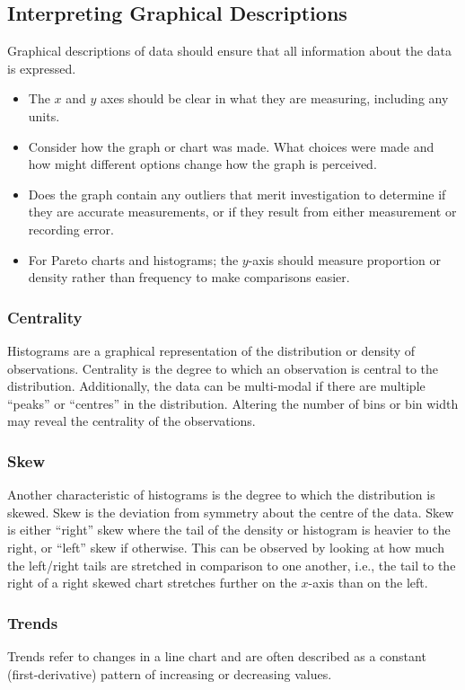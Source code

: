 \documentclass{article}
\begin{document}
\subsection{Interpreting Graphical Descriptions}
Graphical descriptions of data should ensure that all information about
the data is expressed.
\begin{itemize}
    \item The \(x\) and \(y\) axes should be clear in what they are
          measuring, including any units.
    \item Consider how the graph or chart was made. What choices were
          made and how might different options change how the graph is
          perceived.
    \item Does the graph contain any outliers that merit investigation
          to determine if they are accurate measurements, or if they
          result from either measurement or recording error.
    \item For Pareto charts and histograms; the \(y\)-axis should
          measure proportion or density rather than frequency to make
          comparisons easier.
\end{itemize}
\subsubsection{Centrality}
Histograms are a graphical representation of the distribution or
density of observations. Centrality is the degree to which an
observation is central to the distribution. Additionally, the data can
be multi-modal if there are multiple ``peaks'' or ``centres'' in the
distribution. Altering the number of bins or bin width may reveal the
centrality of the observations.
\subsubsection{Skew}
Another characteristic of histograms is the degree to which the
distribution is skewed. Skew is the deviation from symmetry about the
centre of the data. Skew is either ``right'' skew where the tail of the
density or histogram is heavier to the right, or ``left'' skew if
otherwise. This can be observed by looking at how much the left/right
tails are stretched in comparison to one another, i.e., the tail to the
right of a right skewed chart stretches further on the \(x\)-axis than
on the left.
\subsubsection{Trends}
Trends refer to changes in a line chart and are often described as a
constant (first-derivative) pattern of increasing or decreasing values.
\end{document}
